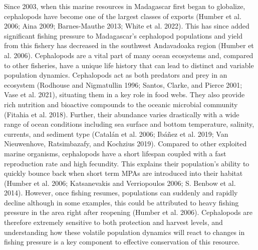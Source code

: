 \documentclass[
]{article}
\begin{document}
Since 2003, when this marine resources in Madagascar first began to globalize, cephalopods have become one of the largest classes of exports (Humber et al. 2006; Aina 2009; Barnes-Mauthe 2013; White et al. 2022). This has since added significant fishing pressure to Madagascar's cephalopod populations and yield from this fishery has decreased in the southwest Andavadoaka region (Humber et al. 2006). Cephalopods are a vital part of many ocean ecosystems and, compared to other fisheries, have a unique life history that can lead to distinct and variable population dynamics. Cephalopods act as both predators and prey in an ecosystem (Rodhouse and Nigmatullin 1996; Santos, Clarke, and Pierce 2001; Vase et al. 2021), situating them in a key role in food webs. They also provide rich nutrition and bioactive compounds to the oceanic microbial community (Fitahia et al. 2018). Further, their abundance varies drastically with a wide range of ocean conditions including sea surface and bottom temperature, salinity, currents, and sediment type (Catalán et al. 2006; Ibáñez et al. 2019; Van Nieuwenhove, Ratsimbazafy, and Kochzius 2019). Compared to other exploited marine organisms, cephalopods have a short lifespan coupled with a fast reproduction rate and high fecundity. This explains their population's ability to quickly bounce back when short term MPAs are introduced into their habitat (Humber et al. 2006; Katsanevakis and Verriopoulos 2006; S. Benbow et al. 2014). However, once fishing resumes, populations can suddenly and rapidly decline although in some examples, this could be attributed to heavy fishing pressure in the area right after reopening (Humber et al. 2006). Cephalopods are therefore extremely sensitive to both protection and harvest levels, and understanding how these volatile population dynamics will react to changes in fishing pressure is a key component to effective conservation of this resource.
\end{document}
